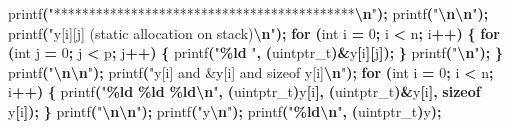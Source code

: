 \documentclass[
  12pt,
]{article}
\newenvironment{Shaded}{\begin{snugshade}}{\end{snugshade}}
\newcommand{\ControlFlowTok}[1]{\textcolor[rgb]{0.13,0.29,0.53}{\textbf{#1}}}
\newcommand{\DataTypeTok}[1]{\textcolor[rgb]{0.13,0.29,0.53}{#1}}
\newcommand{\DecValTok}[1]{\textcolor[rgb]{0.00,0.00,0.81}{#1}}
\newcommand{\KeywordTok}[1]{\textcolor[rgb]{0.13,0.29,0.53}{\textbf{#1}}}
\newcommand{\NormalTok}[1]{#1}
\newcommand{\OperatorTok}[1]{\textcolor[rgb]{0.81,0.36,0.00}{\textbf{#1}}}
\newcommand{\SpecialCharTok}[1]{\textcolor[rgb]{0.81,0.36,0.00}{\textbf{#1}}}
\newcommand{\StringTok}[1]{\textcolor[rgb]{0.31,0.60,0.02}{#1}}
\begin{document}
\begin{Shaded}
\begin{Highlighting}[]
\NormalTok{  printf}\OperatorTok{(}\StringTok{"*******************************************}\SpecialCharTok{\textbackslash{}n}\StringTok{"}\OperatorTok{);}
\NormalTok{  printf}\OperatorTok{(}\StringTok{"}\SpecialCharTok{\textbackslash{}n\textbackslash{}n}\StringTok{"}\OperatorTok{);}
\NormalTok{  printf}\OperatorTok{(}\StringTok{"y[i][j] (static allocation on stack)}\SpecialCharTok{\textbackslash{}n}\StringTok{"}\OperatorTok{);}
  \ControlFlowTok{for} \OperatorTok{(}\DataTypeTok{int}\NormalTok{ i }\OperatorTok{=} \DecValTok{0}\OperatorTok{;}\NormalTok{ i }\OperatorTok{\textless{}}\NormalTok{ n}\OperatorTok{;}\NormalTok{ i}\OperatorTok{++)} \OperatorTok{\{}
    \ControlFlowTok{for} \OperatorTok{(}\DataTypeTok{int}\NormalTok{ j }\OperatorTok{=} \DecValTok{0}\OperatorTok{;}\NormalTok{ j }\OperatorTok{\textless{}}\NormalTok{ p}\OperatorTok{;}\NormalTok{ j}\OperatorTok{++)} \OperatorTok{\{}
\NormalTok{      printf}\OperatorTok{(}\StringTok{"}\SpecialCharTok{\%ld}\StringTok{ "}\OperatorTok{,} \OperatorTok{(}\DataTypeTok{uintptr\_t}\OperatorTok{)\&}\NormalTok{y}\OperatorTok{[}\NormalTok{i}\OperatorTok{][}\NormalTok{j}\OperatorTok{]);}
    \OperatorTok{\}}
\NormalTok{    printf}\OperatorTok{(}\StringTok{"}\SpecialCharTok{\textbackslash{}n}\StringTok{"}\OperatorTok{);}
  \OperatorTok{\}}
\NormalTok{  printf}\OperatorTok{(}\StringTok{"}\SpecialCharTok{\textbackslash{}n\textbackslash{}n}\StringTok{"}\OperatorTok{);}
\NormalTok{  printf}\OperatorTok{(}\StringTok{"y[i] and \&y[i] and sizeof y[i]}\SpecialCharTok{\textbackslash{}n}\StringTok{"}\OperatorTok{);}
  \ControlFlowTok{for} \OperatorTok{(}\DataTypeTok{int}\NormalTok{ i }\OperatorTok{=} \DecValTok{0}\OperatorTok{;}\NormalTok{ i }\OperatorTok{\textless{}}\NormalTok{ n}\OperatorTok{;}\NormalTok{ i}\OperatorTok{++)} \OperatorTok{\{}
\NormalTok{    printf}\OperatorTok{(}\StringTok{"}\SpecialCharTok{\%ld}\StringTok{ }\SpecialCharTok{\%ld}\StringTok{ }\SpecialCharTok{\%ld\textbackslash{}n}\StringTok{"}\OperatorTok{,} \OperatorTok{(}\DataTypeTok{uintptr\_t}\OperatorTok{)}\NormalTok{y}\OperatorTok{[}\NormalTok{i}\OperatorTok{],} \OperatorTok{(}\DataTypeTok{uintptr\_t}\OperatorTok{)\&}\NormalTok{y}\OperatorTok{[}\NormalTok{i}\OperatorTok{],} \KeywordTok{sizeof}\NormalTok{ y}\OperatorTok{[}\NormalTok{i}\OperatorTok{]);}
  \OperatorTok{\}}
\NormalTok{  printf}\OperatorTok{(}\StringTok{"}\SpecialCharTok{\textbackslash{}n\textbackslash{}n}\StringTok{"}\OperatorTok{);}
\NormalTok{  printf}\OperatorTok{(}\StringTok{"y}\SpecialCharTok{\textbackslash{}n}\StringTok{"}\OperatorTok{);}
\NormalTok{  printf}\OperatorTok{(}\StringTok{"}\SpecialCharTok{\%ld\textbackslash{}n}\StringTok{"}\OperatorTok{,} \OperatorTok{(}\DataTypeTok{uintptr\_t}\OperatorTok{)}\NormalTok{y}\OperatorTok{);}

\end{Highlighting}
\end{Shaded}
\end{document}
